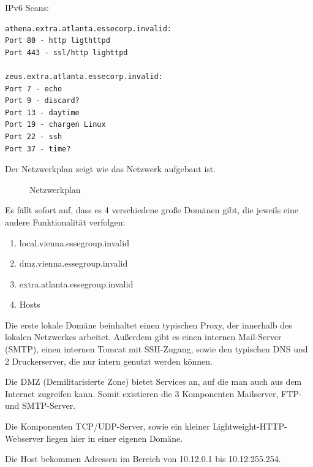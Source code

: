 IPv6 Scans:
\begin{lstlisting}
athena.extra.atlanta.essecorp.invalid:
Port 80 - http ligthttpd
Port 443 - ssl/http lighttpd

zeus.extra.atlanta.essecorp.invalid:
Port 7 - echo
Port 9 - discard?
Port 13 - daytime
Port 19 - chargen Linux
Port 22 - ssh
Port 37 - time?
\end{lstlisting}

Der Netzwerkplan zeigt wie das Netzwerk aufgebaut ist.

\begin{figure}[h!]
  \centering
  \caption{Netzwerkplan}
  \label{fig:netzwerkplan}
\end{figure}

Es fällt sofort auf, dass es 4 verschiedene große Domänen gibt, die jeweils eine andere Funktionalität verfolgen:
\begin{enumerate}
\item local.vienna.essegroup.invalid
\item dmz.vienna.essegroup.invalid
\item extra.atlanta.essegroup.invalid
\item Hosts
\end{enumerate}

Die erste lokale Domäne beinhaltet einen typischen Proxy, der innerhalb des lokalen Netzwerkes arbeitet. Außerdem gibt es einen
internen Mail-Server (SMTP), einen internen Tomcat mit SSH-Zugang, sowie den typischen DNS und 2 Druckerserver, die
nur intern genutzt werden können.

Die DMZ (Demilitarisierte Zone) bietet Services an, auf die man auch aus dem Internet zugreifen kann. Somit existieren die
3 Komponenten Mailserver, FTP- und SMTP-Server.

Die Komponenten TCP/UDP-Server, sowie ein kleiner Lightweight-HTTP-Webserver liegen hier in einer eigenen Domäne.

Die Host bekommen Adressen im Bereich von 10.12.0.1 bis 10.12.255.254.
